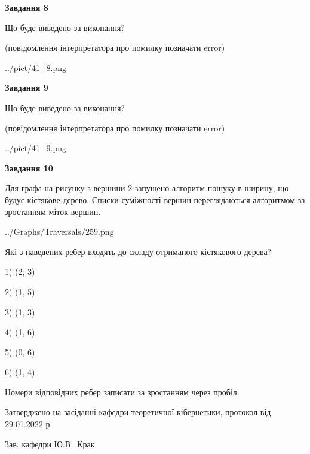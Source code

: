 \documentclass[12pt, ukrainian]{article}
\begin{document}
{\begin {large}
{\begin {center}\textbf{Завдання 8}\end {center}}\par
Що буде виведено за виконання?\par
 (повідомлення інтерпретатора про помилку позначати error)\par
\begin{center}
	{../pict/41_8.png}
\end{center}
\newpage

{\begin {center}\textbf{Завдання 9}\end {center}}\par
Що буде виведено за виконання?\par
 (повідомлення інтерпретатора про помилку позначати error)\par
\begin{center}
	{../pict/41_9.png}
\end{center}
\newpage

{\begin {center}\textbf{Завдання 10}\end {center}}\par
Для графа на рисунку з вершини 2 запущено алгоритм пошуку в ширину, що будує кістякове дерево. Списки суміжності вершин переглядаються алгоритмом за зростанням міток вершин.\par
\begin{center}
	{../Graphs/Traversals/259.png}
\end{center}
\par Які з наведених ребер входять до складу отриманого кістякового дерева?\par
1) (2, 3)\par
2) (1, 5)\par
3) (1, 3)\par
4) (1, 6)\par
5) (0, 6)\par
6) (1, 4)\par
{\vskip 15pt} Номери відповідних ребер записати за зростанням через пробіл.\par
\newpage


\end {large}
}
{\smallskip \begin {small} Затверджено на засіданні кафедри теоретичної кібернетики, протокол  від   29.01.2022 р.\par\smallskip\smallskip
{\parbox {6.5 cm}{Зав. кафедри \dotfill Ю.В.~Крак}} \end{small}}
\end{document}
